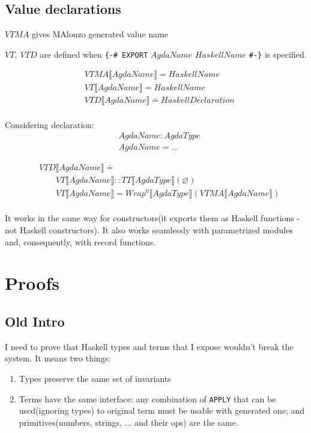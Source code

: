 \subsection{Value declarations}

\(VTMA\) gives MAlonzo generated value name

\(VT,\ VTD\) are defined when \texttt{\{-\# EXPORT} \(AgdaName\) \(HaskellName\) \texttt{\#-\}} is specified.

\begin{align*}
   &VTMA\llbracket AgdaName \rrbracket = HaskellName\\
   &VT\llbracket AgdaName \rrbracket = HaskellName\\
   &VTD\llbracket AgdaName \rrbracket \doteq HaskellDeclaration\\
\end{align*}

Considering declaration:
\begin{align*}
   &AgdaName : AgdaType\\
   &AgdaName = \ldots
\end{align*}

\begin{align*}
   &VTD\llbracket AgdaName \rrbracket \doteq\\
   &\quad\quad VT\llbracket AgdaName \rrbracket :: TT\llbracket AgdaType \rrbracket(\varnothing)\\
   &\quad\quad VT\llbracket AgdaName \rrbracket = Wrap^0\llbracket AgdaType \rrbracket(VTMA\llbracket AgdaName \rrbracket)\\
\end{align*}

It works in the same way for constructors(it exports them as Haskell functions - not Haskell constructors).
It also works seamlessly with parametrized modules and, consequently, with record functions.

\section{Proofs}\label{sec:proofs}

\subsection{Old Intro}

I need to prove that Haskell types and terms that I expose wouldn't break the system.  It means two things:
\begin{enumerate}
\item Types preserve the same set of invariants
\item Terms have the same interface: any combination of \texttt{APPLY} that can be used(ignoring types) to original
      term must be usable with generated one; and primitives(numbers, strings, ... and their ops) are the same.
\end{enumerate}

